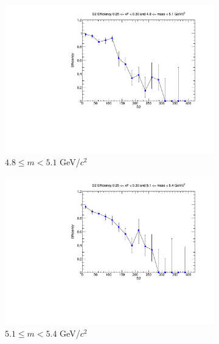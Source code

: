 \documentclass[11pt]{article}
\begin{document}
\begin{figure}[p]
\begin{subfigure}[b]{0.32\textwidth}
        \includegraphics[width=\textwidth]{./kTrackerEfficiencyPlots/D2_Efficiency_xF5_mass2.pdf}
        \caption{$4.8 \leq m < 5.1$ GeV/$c^2$}
    \end{subfigure}\vspace{0.5cm}
    \begin{subfigure}[b]{0.32\textwidth}
        \centering
        \includegraphics[width=\textwidth]{./kTrackerEfficiencyPlots/D2_Efficiency_xF5_mass3.pdf}
        \caption{$5.1 \leq m < 5.4$ GeV/$c^2$}
    \end{subfigure}\hfill
    \begin{subfigure}[b]{0.32\textwidth}
        \centering

\end{subfigure}
\end{figure}
\end{document}
